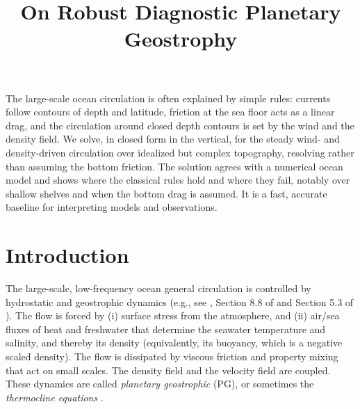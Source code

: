 \documentclass{ametsocV6.2}
\title{On Robust Diagnostic Planetary Geostrophy}
\affiliation{Earth \& Planetary Sciences, Johns Hopkins University, Baltimore, MD}
\begin{document}
\maketitle

%
%
\statement
The large-scale ocean circulation is often explained by simple rules: currents follow contours of depth and latitude, friction at the sea floor acts as a linear drag, and the circulation around closed depth contours is set by the wind and the density field. We solve, in closed form in the vertical, for the steady wind- and density-driven circulation over idealized but complex topography, resolving rather than assuming the bottom friction. 
The solution agrees with a numerical ocean model and shows where the classical rules hold and where they fail, notably over shallow shelves and when the bottom drag is assumed. It is a fast, accurate baseline for interpreting models and observations.
%


%


\section{Introduction}
\label{sect:introduction}

The large-scale, low-frequency ocean general circulation is controlled by hydrostatic and geostrophic dynamics (e.g., see \citealt{pedlosky87b}, Section 8.8 of \citealt{salmon98} and Section 5.3 of \citealt{vallis06}).
The flow is forced by (i) surface stress from the atmosphere, and (ii) air/sea fluxes of heat and freshwater that determine the seawater temperature and salinity, and thereby its density (equivalently, its buoyancy, which is a negative scaled density).
The flow is dissipated by viscous friction and property mixing that act on small scales.
The density field and the velocity field are coupled.
These dynamics are called \emph{planetary geostrophic} (PG), or sometimes the \emph{thermocline equations} \citep{robinson&stommel59,welander59,colindeverdiere88}.
\end{document}
